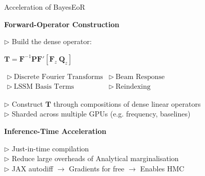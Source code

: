 \documentclass{beamer}
\newcommand{\bayesgridblock}[3][1.72cm]{%
  \begin{beamerboxesrounded}[upper=block title,lower=block body,shadow=true,width=\linewidth]{\textbf{#2}}
    \small
    \parbox[t][#1][t]{0.94\linewidth}{\raggedright #3\par}
  \end{beamerboxesrounded}
}
\begin{document}
\begin{frame}{Acceleration of BayesEoR}
\scriptsize
{
\bayesgridblock[2.95cm]{Forward-Operator Construction}{%
$\triangleright$ Build the dense operator:\\[0.10em]
{\centering \(\mathbf{T} = \mathbf{F}^{-1}\mathbf{P}\mathbf{F}'\!\left[\mathbf{F}_{z}\ \mathbf{Q}_{z}\right]\)\par}
\vspace{0.34em}
{\(
\begin{array}{ll}
\triangleright\ \text{Discrete Fourier Transforms} & \triangleright\ \text{Beam Response}\\[0.10em]
\triangleright\ \text{LSSM Basis Terms} & \triangleright\ \text{Reindexing}
\end{array}
\)\par}
\vspace{0.34em}
$\triangleright$ Construct \(\mathbf{T}\) through compositions of dense linear operators\\[0.10em]
\hspace{0.34em} $\triangleright$ Sharded across multiple GPUs (e.g. frequency, baselines)
}
}

\vspace{0.35em}
{
\bayesgridblock[1.95cm]{Inference-Time Acceleration}{%
$\triangleright$ Just-in-time compilation\\[0.18em]
$\triangleright$ Reduce large overheads of Analytical marginalisation\\[0.18em]
$\triangleright$ JAX autodiff $\rightarrow$ Gradients for free $\rightarrow$ Enables HMC\\[0.18em]
}
}
\end{frame}
\end{document}

